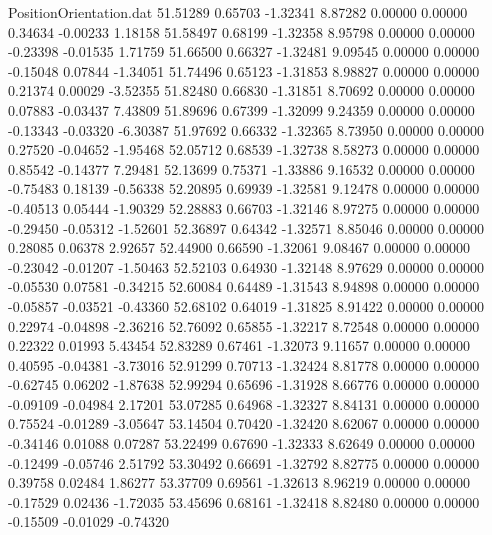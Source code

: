 \begin{filecontents}{PositionOrientation.dat}
  51.51289    0.65703   -1.32341     8.87282    0.00000    0.00000    0.34634   -0.00233    1.18158
  51.58497    0.68199   -1.32358     8.95798    0.00000    0.00000   -0.23398   -0.01535    1.71759
  51.66500    0.66327   -1.32481     9.09545    0.00000    0.00000   -0.15048    0.07844   -1.34051
  51.74496    0.65123   -1.31853     8.98827    0.00000    0.00000    0.21374    0.00029   -3.52355
  51.82480    0.66830   -1.31851     8.70692    0.00000    0.00000    0.07883   -0.03437    7.43809
  51.89696    0.67399   -1.32099     9.24359    0.00000    0.00000   -0.13343   -0.03320   -6.30387
  51.97692    0.66332   -1.32365     8.73950    0.00000    0.00000    0.27520   -0.04652   -1.95468
  52.05712    0.68539   -1.32738     8.58273    0.00000    0.00000    0.85542   -0.14377    7.29481
  52.13699    0.75371   -1.33886     9.16532    0.00000    0.00000   -0.75483    0.18139   -0.56338
  52.20895    0.69939   -1.32581     9.12478    0.00000    0.00000   -0.40513    0.05444   -1.90329
  52.28883    0.66703   -1.32146     8.97275    0.00000    0.00000   -0.29450   -0.05312   -1.52601
  52.36897    0.64342   -1.32571     8.85046    0.00000    0.00000    0.28085    0.06378    2.92657
  52.44900    0.66590   -1.32061     9.08467    0.00000    0.00000   -0.23042   -0.01207   -1.50463
  52.52103    0.64930   -1.32148     8.97629    0.00000    0.00000   -0.05530    0.07581   -0.34215
  52.60084    0.64489   -1.31543     8.94898    0.00000    0.00000   -0.05857   -0.03521   -0.43360
  52.68102    0.64019   -1.31825     8.91422    0.00000    0.00000    0.22974   -0.04898   -2.36216
  52.76092    0.65855   -1.32217     8.72548    0.00000    0.00000    0.22322    0.01993    5.43454
  52.83289    0.67461   -1.32073     9.11657    0.00000    0.00000    0.40595   -0.04381   -3.73016
  52.91299    0.70713   -1.32424     8.81778    0.00000    0.00000   -0.62745    0.06202   -1.87638
  52.99294    0.65696   -1.31928     8.66776    0.00000    0.00000   -0.09109   -0.04984    2.17201
  53.07285    0.64968   -1.32327     8.84131    0.00000    0.00000    0.75524   -0.01289   -3.05647
  53.14504    0.70420   -1.32420     8.62067    0.00000    0.00000   -0.34146    0.01088    0.07287
  53.22499    0.67690   -1.32333     8.62649    0.00000    0.00000   -0.12499   -0.05746    2.51792
  53.30492    0.66691   -1.32792     8.82775    0.00000    0.00000    0.39758    0.02484    1.86277
  53.37709    0.69561   -1.32613     8.96219    0.00000    0.00000   -0.17529    0.02436   -1.72035
  53.45696    0.68161   -1.32418     8.82480    0.00000    0.00000   -0.15509   -0.01029   -0.74320

\end{filecontents}
